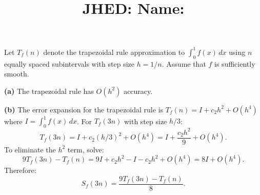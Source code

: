 \documentclass[reqno]{exam}
\title{\normalsize{
  JHED: \underline{\hspace{4cm}} \hspace{1em} Name: \underline{\hspace{9cm}}}
   }
\author{}
\date{}
\begin{document}
\maketitle
\vspace{-2cm} %

\begin{questions}
  \question

  Let $T_f(n)$ denote the trapezoidal rule approximation to $\int_0^1 f(x) \, dx$ using $n$ equally spaced subintervals with step size $h = 1/n$. Assume that $f$ is sufficiently smooth.


\begin{solution}
\textbf{(a)} The trapezoidal rule has $O(h^2)$ accuracy.

\textbf{(b)} The error expansion for the trapezoidal rule is $T_f(n) = I + c_2h^2 + O(h^4)$ where $I = \int_0^1 f(x)\,dx$. For $T_f(3n)$ with step size $h/3$:
$$T_f(3n) = I + c_2(h/3)^2 + O(h^4) = I + \frac{c_2h^2}{9} + O(h^4).$$
To eliminate the $h^2$ term, solve:
$$9T_f(3n) - T_f(n) = 9I + c_2h^2 - I - c_2h^2 + O(h^4) = 8I + O(h^4).$$
Therefore:
$$S_f(3n) = \frac{9T_f(3n) - T_f(n)}{8}.$$


\end{solution}
\end{questions}
\end{document}
